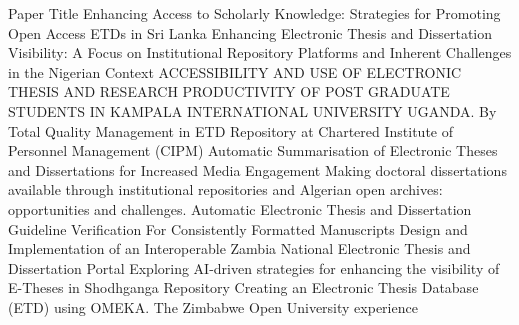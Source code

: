        
        
        Paper Title
Enhancing Access to Scholarly Knowledge: Strategies for Promoting Open Access ETDs in Sri Lanka 
Enhancing Electronic Thesis and Dissertation Visibility: A Focus on Institutional Repository Platforms and Inherent Challenges in the Nigerian Context
ACCESSIBILITY AND USE OF ELECTRONIC THESIS AND RESEARCH PRODUCTIVITY OF POST GRADUATE STUDENTS IN KAMPALA INTERNATIONAL UNIVERSITY UGANDA. By
Total Quality Management in ETD Repository at Chartered Institute of Personnel Management (CIPM)
Automatic Summarisation of Electronic Theses and Dissertations for Increased Media Engagement  
Making doctoral dissertations available through institutional repositories and Algerian open archives: opportunities and challenges.
Automatic Electronic Thesis and Dissertation Guideline Verification For Consistently Formatted Manuscripts 
Design and Implementation of an Interoperable Zambia National Electronic Thesis and Dissertation Portal
Exploring AI-driven strategies for enhancing the visibility of E-Theses in Shodhganga Repository
Creating an Electronic Thesis Database (ETD) using OMEKA. The Zimbabwe Open University experience

